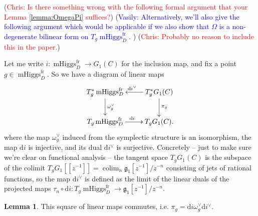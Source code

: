 \documentclass[11pt, oneside, reqno]{amsart}
\theoremstyle{definition} \newtheorem{definition}{Definition}[section]
\newtheorem{lemma}[definition]{Lemma}
\theoremstyle{definition} \newtheorem{remark}[definition]{Remark}
\theoremstyle{definition} \newtheorem{remarks}[definition]{Remarks}
\theoremstyle{definition} \newtheorem{question}[definition]{Question}
\theoremstyle{definition} \newtheorem*{note}{Note}
\theoremstyle{definition} \newtheorem{example}[definition]{Example}
\theoremstyle{definition} \newtheorem{examples}[definition]{Examples}
\renewcommand{\gg}{\mathfrak{g}}
\DeclareMathOperator{\mhiggs}{mHiggs}
\DeclareMathOperator{\colim}{colim}
\renewcommand{\d}{\mathrm{d}}
\newcommand{\fr}{\mathrm{fr}}
\newcommand{\chris}[1]{(\textcolor{red}{Chris: #1})}
\newcommand{\vasily}[1]{(\textcolor{blue}{Vasily: #1})}
\begin{document}
 
\chris{Is there something wrong with the following formal argument that your Lemma \ref{lemma:OmegaPi} suffices?}
\vasily{Alternatively, we'll also give the following argument which
  would be applicable if we also show that $\Omega$
  is a non-degenerate  bilinear form on $T_{g} \mhiggs^{\fr}_{D}$. } \chris{Probably no reason to include this in the paper.}


Let me write $i \colon \mhiggs^\fr_D \to G_1(C)$ for the inclusion map, and fix a point $g \in \mhiggs^\fr_D$.  So we have a diagram of linear maps
\[\xymatrix{
T^*_g \mhiggs^\fr_D \ar[d]^{\omega^\vee_g} &T^*_g {G_1(C)} \ar[d]^{\pi_g} \ar[l]_{\d i^\vee} \\
T_g \mhiggs^\fr_D \ar[r]^{\d i} &T_g {G_1(C)}. 
}\]
where the map $\omega^\vee_g$ induced from the symplectic structure is an isomorphism, the map $\d i$ is injective, and its dual $\d i^\vee$ is surjective.  Concretely -- just to make sure we're clear on functional analysis -- the tangent space $T_g {G_1(C)}$ is the subspace of the colimit $T_g G_1[[z^{-1}]] = \colim_n \gg_1[z^{-1}]/z^{-n}$ consisting of jets of rational functions, so the map $\d i^\vee$ is defined as the limit of the linear duals of the projected maps $\tau_n \circ \d i \colon T_g \mhiggs^\fr_D \to \gg_1[z^{-1}]/z^{-n}$.



\begin{lemma} \label{commuting_diagram_lemma}
This square of linear maps commutes, i.e. $\pi_g = \d i \omega^\vee_g \d i^\vee$.
\end{lemma}
\end{document}
